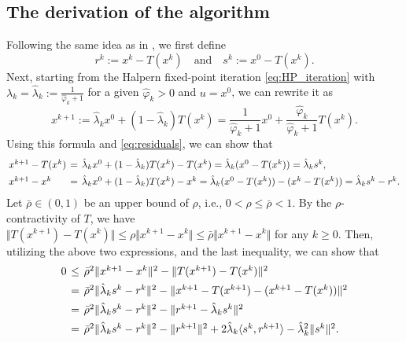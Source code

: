 \documentclass{article}
\theoremstyle{plain}
\theoremstyle{definition}
\newcommand{\norms}[1]{\Vert#1\Vert}
\newcommand{\iprods}[1]{\langle #1\rangle}
\newcommand{\0}{\boldsymbol{0}}
\begin{document}
\subsection{The derivation of the algorithm}\label{subsec:A2_derivation}
Following the same idea as in \cite{he2024convergence}, we first define
\begin{equation}\label{eq:residuals}	
	r^k := x^k-T(x^k) \quad \text{and} \quad s^k := x^0-T(x^k).
\end{equation}	
Next, starting from the Halpern fixed-point iteration \eqref{eq:HP_iteration} with $\lambda_k = \hat{\lambda}_k := \frac{1}{\hat{\varphi}_k + 1}$ for a given $\hat{\varphi}_k > 0$ and $u = x^0$, we can rewrite it as
\begin{equation}\label{eq:HP_iteration2}
x^{k+1} := \hat{\lambda}_k x^0 + (1 - \hat{\lambda}_k)T(x^k) = \frac{1}{\hat{\varphi}_k + 1}x^0 + \frac{\hat{\varphi}_k}{\hat{\varphi}_k + 1}T(x^k).
\end{equation}
Using this formula and \eqref{eq:residuals}, we can show that
\begin{equation*}
\arraycolsep=0.2em
\begin{array}{lcl}
x^{k+1} - T(x^k) & = & \hat{\lambda}_kx^0 + (1-\hat{\lambda}_k)T(x^k) - T(x^k) = \hat{\lambda}_k(x^0 - T(x^k)) = \hat{\lambda}_ks^k, \vspace{1ex}\\
x^{k+1} - x^k & = & \hat{\lambda}_k x^0 +  (1-\hat{\lambda}_k)T(x^k) - x^k = \hat{\lambda}_k(x^0 - T(x^k))  - (x^k - T(x^k)) = \hat{\lambda}_ks^k - r^k.
\end{array}
\end{equation*}
Let $\bar{\rho} \in (0, 1)$ be an upper bound of $\rho$, i.e., $0 < \rho \leq \bar{\rho} < 1$.
By the $\rho$-contractivity of $T$, we have $\norms{T(x^{k+1}) - T(x^k)} \leq \rho\norms{x^{k+1} - x^k} \leq \bar{\rho}\norms{x^{k+1} - x^k}$ for any $k \geq 0$.
Then, utilizing the above two expressions, and the last inequality, we can show that 
\begin{equation*}
\arraycolsep=0.2em
\begin{array}{lcl}
0 &\leq & \bar{\rho}^2\norms{x^{k+1} - x^k}^2 - \norms{T(x^{k+1}) - T(x^k)}^2 \vspace{1ex}\\
& = & \bar{\rho}^2\norms{\hat{\lambda}_ks^k - r^k}^2 - \norms{x^{k+1} - T(x^{k+1}) - (x^{k+1} - T(x^k))}^2 \vspace{1ex}\\
& = & \bar{\rho}^2\norms{\hat{\lambda}_ks^k - r^k}^2 - \norms{r^{k+1} - \hat{\lambda}_ks^k}^2 \vspace{1ex}\\
& = & \bar{\rho}^2\norms{\hat{\lambda}_ks^k - r^k}^2 - \norms{r^{k+1}}^2 + 2\hat{\lambda}_k\iprods{s^k, r^{k+1}} - \hat{\lambda}_k^2\norms{s^k}^2.
\end{array}
\end{equation*}
\end{document}
